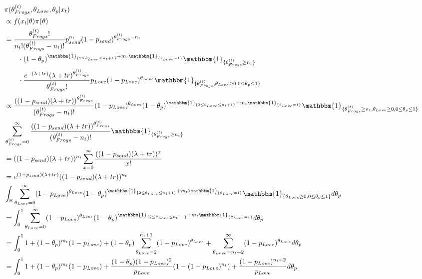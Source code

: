 \documentclass[10pt, a4paper]{article}
\begin{document}
    \begin{align*}
        &\pi(\theta_{Frogs}^{(t)}, \theta_{Love}, \theta_p|x_t) \\
        &\propto f(x_t|\theta)\pi(\theta) \\
        &= \frac{\theta_{Frogs}^{(t)}!}{n_t!(\theta_{Frogs}^{(t)}-n_t)!}p_{send}^{n_t}(1-p_{send})^{\theta_{Frogs}^{(t)}-n_t} \\&\qquad\cdot (1-\theta_p)^{\mathbbm{1}_{\{2\leq\theta_{Love}\leq n_t+1\}} + m_t\mathbbm{1}_{\{\theta_{Love} = 1\}}} \mathbbm{1}_{\{\theta_{Frogs}^{(t)}\geq n_t\}} \\&\qquad\cdot \frac{e^{-(\lambda+tr)}(\lambda+tr)^{\theta_{Frogs}^{(t)}}}{\theta_{Frogs}^{(t)}!}p_{Love}(1-p_{Love})^{\theta_{Love}} \mathbbm{1}_{\{\theta_{Frogs}^{(t)}, \theta_{Love}\geq 0, 0 \leq \theta_p \leq 1\}} \\
        &\propto \frac{((1-p_{send})(\lambda+tr))^{\theta_{Frogs}^{(t)}}}{(\theta_{Frogs}^{(t)}-n_t)!}(1-p_{Love})^{\theta_{Love}}(1-\theta_p)^{\mathbbm{1}_{\{2\leq\theta_{Love}\leq n_t+1\}} + m_t\mathbbm{1}_{\{\theta_{Love} = 1\}}}\mathbbm{1}_{\{\theta_{Frogs}^{(t)}\geq n_t, \theta_{Love}\geq 0, 0 \leq \theta_p \leq 1\}} \\
        &\sum_{\theta_{Frogs}^{(t)}=0}^{\infty} \frac{((1-p_{send})(\lambda+tr))^{\theta_{Frogs}^{(t)}}}{(\theta_{Frogs}^{(t)}-n_t)!}\mathbbm{1}_{\{\theta_{Frogs}^{(t)}\geq n_t\}} \\
        &= ((1-p_{send})(\lambda+tr))^{n_t}\sum_{x=0}^{\infty} \frac{((1-p_{send})(\lambda+tr))^x}{x!} \\
        &= e^{(1-p_{send})(\lambda+tr)}((1-p_{send})(\lambda+tr))^{n_t} \\
        &\int_{\mathbb{R}}\sum_{\theta_{Love}=0}^{\infty} (1-p_{Love})^{\theta_{Love}}(1-\theta_p)^{\mathbbm{1}_{\{2\leq\theta_{Love}\leq n_t+1\}} + m_t\mathbbm{1}_{\{\theta_{Love} = 1\}}} \mathbbm{1}_{\{\theta_{Love}\geq 0, 0 \leq \theta_p \leq 1\}}d\theta_p \\
        &= \int_0^1\sum_{\theta_{Love}=0}^{\infty}(1-p_{Love})^{\theta_{Love}}(1-\theta_p)^{\mathbbm{1}_{\{2\leq\theta_{Love}\leq n_t+1\}} + m_t\mathbbm{1}_{\{\theta_{Love} = 1\}}} d\theta_p \\
        &= \int_0^1 1 + (1-\theta_p)^{m_t}(1-p_{Love}) + (1-\theta_p)\sum_{\theta_{Love}=2}^{n_t+1}(1-p_{Love})^{\theta_{Love}} + \sum_{\theta_{Love}=n_t+2}^{\infty} (1-p_{Love})^{\theta_{Love}} d\theta_p \\
        &= \int_0^1 1 + (1-\theta_p)^{m_t}(1-p_{Love}) + \frac{(1-\theta_p)(1-p_{Love})^2}{p_{Love}}(1- (1-p_{Love})^{n_t}) + \frac{(1-p_{Love})^{n_t+2}}{p_{Love}} d\theta_p \\

\end{align*}
\end{document}
